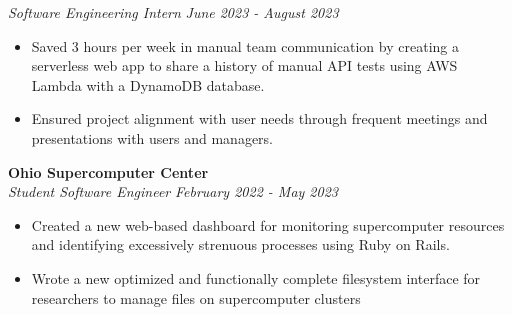 \documentclass[letterpaper]{article}
\begin{document}
    
    \textit{Software Engineering Intern} \hfill \textsl{June 2023 - August 2023}\\
    \vspace{-7pt}
    \begin{itemize} \itemsep -1mm
        
            \item Saved 3 hours per week in manual team communication by creating a serverless web app to share a history of manual API tests using AWS Lambda with a DynamoDB database.
        
            \item Ensured project alignment with user needs through frequent meetings and presentations with users and managers.
        
    \end{itemize}
    \vspace{-2mm}

    
    \textbf{Ohio Supercomputer Center}\\
    
    \textit{Student Software Engineer} \hfill \textsl{February 2022 - May 2023}\\
    \vspace{-7pt}
    \begin{itemize} \itemsep -1mm
        
            \item Created a new web-based dashboard for monitoring supercomputer resources and identifying excessively strenuous processes using Ruby on Rails.

            \item Wrote a new optimized and functionally complete filesystem interface for researchers to manage files on supercomputer clusters


        
        
    \end{itemize}
    \vspace{-2mm}
\end{document}
